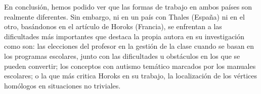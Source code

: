 	En conclusión, hemos podido ver que las formas de trabajo en ambos países son realmente diferentes. Sin embargo,  ni en un país con Thales (España) ni en el otro, basándonos en el artículo de Horoks (Francia), se enfrentan a las dificultades más importantes que destaca la propia autora en su investigación como son: las elecciones del profesor en la gestión de la clase cuando se basan en los programas escolares, junto con las dificultades u obstáculos en los que se pueden convertir; los conceptos con autismo temático marcados por los manuales escolares; o la que más critica Horoks en su trabajo, la localización de los vértices homólogos en situaciones no triviales.
	
	
	

	
	
	
	
	
	